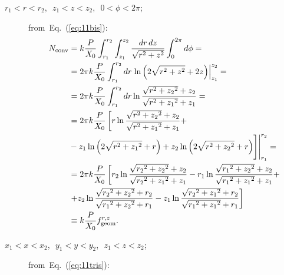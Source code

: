 \begin{description}
\item[$r_1<r<r_2$,~$\, z_1<z<z_2$,~$\, 0<\phi<2\pi$;]
  from~Eq.~(\ref{eq:11bis}): 
\begin{equation}
\begin{split}
N_{\rm conv} & = k
\frac{P}{X_0} \int_{r_1}^{r_2} \int_{z_1}^{z_2} \frac{dr \, dz}{\sqrt{r^2+z^2}}
\int_0^{2\pi} d\phi = \\
& = 2\pi k \frac{P}{X_0} \int_{r_1}^{r_2} dr \left. \ln \left( 2\sqrt{r^2+z^2}+2z \right) \right|_{z_1}^{z_2} = \\
& = 2\pi k \frac{P}{X_0} \int_{r_1}^{r_2} dr \ln \frac{\sqrt{r^2+{z_2}^2}+z_2}{\sqrt{r^2+{z_1}^2}+{z_1}} = \\ 
& = 2\pi k \frac{P}{X_0} \left[ r \ln \frac{\sqrt{r^2+{z_2}^2}+z_2}{\sqrt{r^2+{z_1}^2}+{z_1}} + \right. \\
& - z_1 \ln \left( 2\sqrt{r^2+{z_1}^2}+r \right)  + \Biggl. \Biggl. z_2 \ln \left( 2\sqrt{r^2+{z_2}^2}+r \right) \Biggr] \Biggr|_{r_1}^{r_2} = \\
& = 2\pi k \frac{P}{X_0} \left[ r_2 \ln \frac{\sqrt{{r_2}^2+{z_2}^2}+z_2}{\sqrt{{r_2}^2+{z_1}^2}+z_1} - r_1 \ln \frac{\sqrt{{r_1}^2+{z_2}^2}+z_2}{\sqrt{{r_1}^2+{z_1}^2}+z_1} + \right. \\
& \left. + z_2 \ln \frac{\sqrt{{r_2}^2+{z_2}^2}+r_2}{\sqrt{{r_1}^2+{z_2}^2}+r_1} - z_1 \ln \frac{\sqrt{{r_2}^2+{z_1}^2}+r_2}{\sqrt{{r_1}^2+{z_1}^2}+r_1} \right] \\
& \equiv k \frac{P}{X_0} f^{r, z}_{\rm geom}.\\
\end{split}
\label{eq:13}
\end{equation}
\item[$x_1<x<x_2$,~$\, y_1<y<y_2$,~$\, z_1<z<z_2$;]
  from~Eq.~(\ref{eq:11tris}): 

\end{description}

